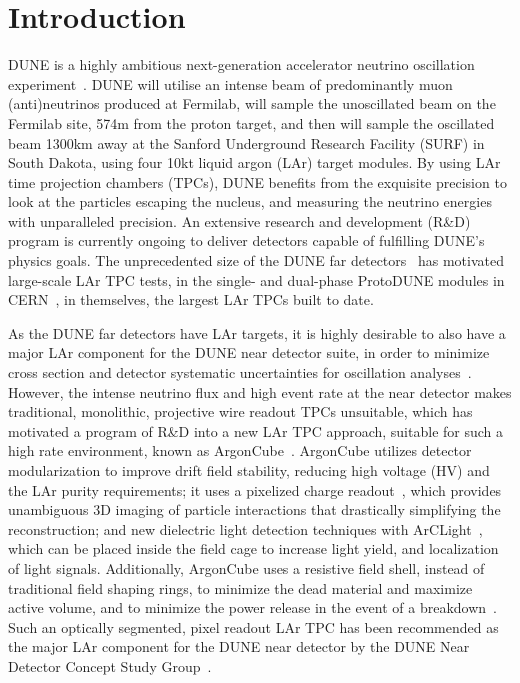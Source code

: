 \section{Introduction}
\label{sec:introduction}

DUNE is a highly ambitious next-generation accelerator neutrino oscillation experiment~\cite{DUNE, DUNE2}. DUNE will utilise an intense beam of predominantly muon (anti)neutrinos produced at Fermilab, will sample the unoscillated beam on the Fermilab site, 574m from the proton target, and then will sample the oscillated beam 1300km away at the Sanford Underground Research Facility (SURF) in South Dakota, using four 10kt liquid argon (LAr) target modules. By using LAr time projection chambers (TPCs), DUNE benefits from the exquisite precision to look at the particles escaping the nucleus, and measuring the neutrino energies with unparalleled precision. An extensive research and development (R\&D) program is currently ongoing to deliver detectors capable of fulfilling DUNE's physics goals. The unprecedented size of the DUNE far detectors~\cite{DUNE_IDR_v1, DUNE_IDR_v2, DUNE_IDR_v3} has motivated large-scale LAr TPC tests, in the single- and dual-phase ProtoDUNE modules in CERN~\cite{Abi:2017aow, Agostino:2014qoa}, in themselves, the largest LAr TPCs built to date.

As the DUNE far detectors have LAr targets, it is highly desirable to also have a major LAr component for the DUNE near detector suite, in order to minimize cross section and detector systematic uncertainties for oscillation analyses~\cite{DUNE, DUNE2}. However, the intense neutrino flux and high event rate at the near detector makes traditional, monolithic, projective wire readout TPCs unsuitable, which has motivated a program of R\&D into a new LAr TPC approach, suitable for such a high rate environment, known as ArgonCube~\cite{argoncube_loi}. ArgonCube utilizes detector modularization to improve drift field stability, reducing high voltage (HV) and the LAr purity requirements; it uses a pixelized charge readout~\cite{pixels, larpix}, which provides unambiguous 3D imaging of particle interactions that drastically simplifying the reconstruction; and new dielectric light detection techniques with ArCLight~\cite{arclight}, which can be placed inside the field cage to increase light yield, and localization of light signals. Additionally, ArgonCube uses a resistive field shell, instead of traditional field shaping rings, to minimize the dead material and maximize active volume, and to minimize the power release in the event of a breakdown~\cite{argoncube_fd}. Such an optically segmented, pixel readout LAr TPC has been recommended as the major LAr component for the DUNE near detector by the DUNE Near Detector Concept Study Group~\cite{dune_ndcsg}.

